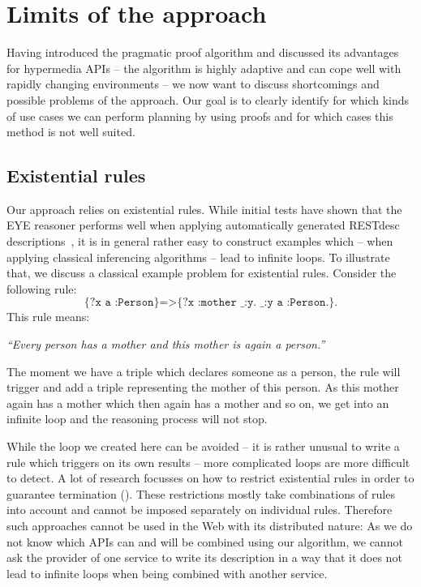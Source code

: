 \section{Limits of the approach}\label{sec:limits}
Having introduced the pragmatic proof algorithm and discussed its advantages for hypermedia APIs -- the algorithm is highly adaptive and can cope well with rapidly 
changing environments -- we now want to discuss shortcomings and possible problems of the approach.
Our
goal is to clearly identify for which kinds of use cases we can perform planning by using proofs and for which cases this method is not well suited.

\subsection{Existential rules}
Our approach relies on existential rules. While initial tests have shown that the EYE reasoner performs well when applying automatically generated RESTdesc 
descriptions~\cite{PP}, it is in general rather easy to construct examples which -- when applying classical inferencing algorithms -- 
lead to infinite loops. To illustrate that, we discuss a classical example problem for existential rules. Consider the following rule:
\[
\texttt{ \{?x a :Person\}=>\{?x :mother \_:y. \_:y a :Person.\}. }
\]
This rule means:

\begin{center}\textit{``Every person has a mother and this mother is again a person.''}\end{center}

The moment we have a triple which declares someone as a person, the rule will trigger and add a triple representing
the mother of this person. As this mother again has a mother which then again has a mother and so on, we get into an infinite loop and the reasoning process will not stop.

While the loop we created here can be avoided -- it is rather unusual to write a rule which triggers on its own results -- more complicated loops are more difficult to detect.
A lot of research focusses on how to restrict existential rules in order to guarantee termination %
(\eg \cite{krotzsch2011extending,gottlob2013combining,Baget}). 
These restrictions mostly take combinations of rules into account and cannot be imposed separately on individual rules. %
Therefore such approaches cannot be 
used in the Web with its distributed nature: As we do not know which APIs can and will be combined using our algorithm, we cannot ask the provider of one service 
to write its description in a way that it does not lead to infinite loops when being combined with another service.


